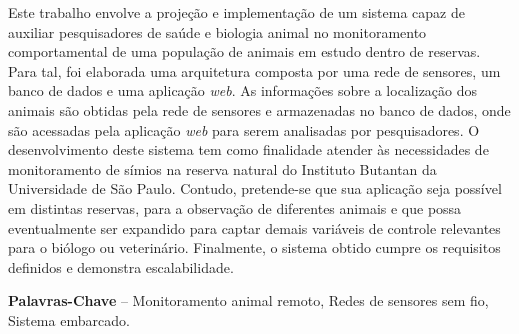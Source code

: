 \begin{resumo}

Este trabalho envolve a projeção e implementação de um sistema capaz de auxiliar pesquisadores de saúde e biologia animal no monitoramento comportamental de uma população de animais em estudo dentro de reservas. Para tal, foi elaborada uma arquitetura composta por uma rede de sensores, um banco de dados e uma aplicação \emph{web}. As informações sobre a localização dos animais são obtidas pela rede de sensores e armazenadas no banco de dados, onde são acessadas pela aplicação \emph{web} para serem analisadas por pesquisadores. O desenvolvimento deste sistema tem como finalidade atender às necessidades de monitoramento de símios na reserva natural do Instituto Butantan da Universidade de São Paulo. Contudo, pretende-se que sua aplicação seja possível em distintas reservas, para a observação de diferentes animais e que possa eventualmente ser expandido para captar demais variáveis de controle relevantes para o biólogo ou veterinário. Finalmente, o sistema obtido cumpre os requisitos definidos e demonstra escalabilidade.

\textbf{Palavras-Chave} -- Monitoramento animal remoto, Redes de sensores sem fio, Sistema embarcado.
\end{resumo}
